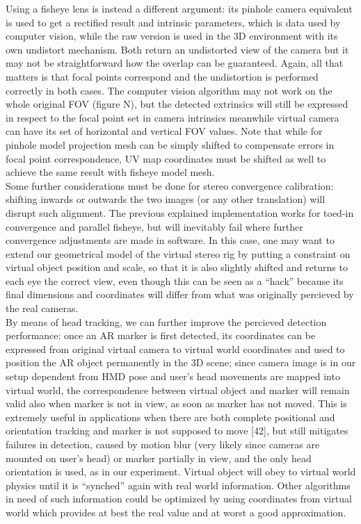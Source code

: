 Using a fisheye lens is instead a different argument: its pinhole camera equivalent is used to get a rectified result and intrinsic parameters, which is data used by computer vision, while the raw version is used in the 3D environment with its own undistort mechanism. Both return an undistorted view of the camera but it may not be straightforward how the overlap can be guaranteed. Again, all that matters is that focal points correspond and the undistortion is performed correctly in both cases. The computer vision algorithm may not work on the whole original FOV (figure N), but the detected extrinsics will still be expressed in respect to the focal point set in camera intrinsics meanwhile virtual camera can have its set of horizontal and vertical FOV values. Note that while for pinhole model projection mesh can be simply shifted to compensate errors in focal point correspondence, UV map coordinates must be shifted as well to achieve the same result with fisheye model mesh.\\
Some further considerations must be done for stereo convergence calibration: shifting inwards or outwards the two images (or any other translation) will disrupt such alignment. The previous explained implementation works for toed-in convergence and parallel fisheye, but will inevitably fail where further convergence adjustments are made in software. In this case, one may want to extend our geometrical model of the virtual stereo rig by putting a constraint on virtual object position and scale, so that it is also slightly shifted and returns to each eye the correct view, even though this can be seen as a “hack” because its final dimensions and coordinates will differ from what was originally percieved by the real cameras.\\
By means of head tracking, we can further improve the percieved detection performance: once an AR marker is first detected, its coordinates can be expressed from original virtual camera to virtual world coordinates and used to position the AR object permanently in the 3D scene; since camera image is in our setup dependent from HMD pose and user’s head movements are mapped into virtual world, the correspondence between virtual object and marker will remain valid also when marker is not in view, as soon as marker has not moved. This is extremely useful in applications when there are both complete positional and orientation tracking and marker is not supposed to move [42], but still mitigates failures in detection, caused by motion blur (very likely since cameras are mounted on user’s head)  or marker partially in view, and the only head orientation is used, as in our experiment. Virtual object will obey to virtual world physics until it is “synched” again with real world information. Other algorithms in need of such information could be optimized by using coordinates from virtual world which provides at best the real value and at worst a good approximation.


